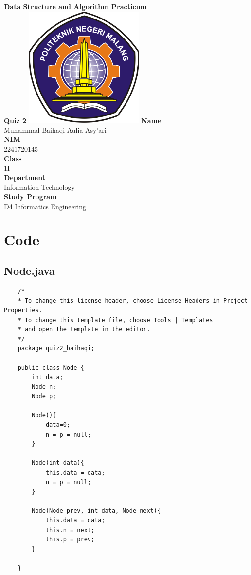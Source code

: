 \documentclass[12pt,titlepage]{article}
\newcommand{\vSubject}{Data Structure and Algorithm Practicum}
\newcommand{\vSubtitle}{Quiz 2}
\newcommand{\vName}{Muhammad Baihaqi Aulia Asy'ari}
\newcommand{\vNIM}{2241720145}
\newcommand{\vClass}{1I}
\newcommand{\vDepartment}{Information Technology}
\newcommand{\vStudyProgram}{D4 Informatics Engineering}
\begin{document}
\begin{titlepage}
    \centering
    \vfill
    {\bfseries\LARGE
        \vSubject\\
        \vskip0.25cm
        \vSubtitle
    }
    \vfill
    \includegraphics[width=6cm]{images/polinema-logo.png}
    \vfill
    {
        \textbf{Name}\\
        \vName\\
        \vskip0.5cm
        \textbf{NIM}\\
        \vNIM\\
        \vskip0.5cm
        \textbf{Class}\\
        \vClass\\
        \vskip0.5cm
        \textbf{Department}\\
        \vDepartment\\
        \vskip0.5cm
        \textbf{Study Program}\\
        \vStudyProgram
    }
\end{titlepage}

\newpage

\section{Code}
\subsection{Node.java}
\begin{verbatim}
    /*
    * To change this license header, choose License Headers in Project Properties.
    * To change this template file, choose Tools | Templates
    * and open the template in the editor.
    */
    package quiz2_baihaqi;

    public class Node {
        int data;
        Node n;
        Node p;
        
        Node(){
            data=0;
            n = p = null;
        }
        
        Node(int data){
            this.data = data;
            n = p = null;
        }
        
        Node(Node prev, int data, Node next){
            this.data = data;
            this.n = next;
            this.p = prev;
        }
        
    }
\end{verbatim}
\end{document}
